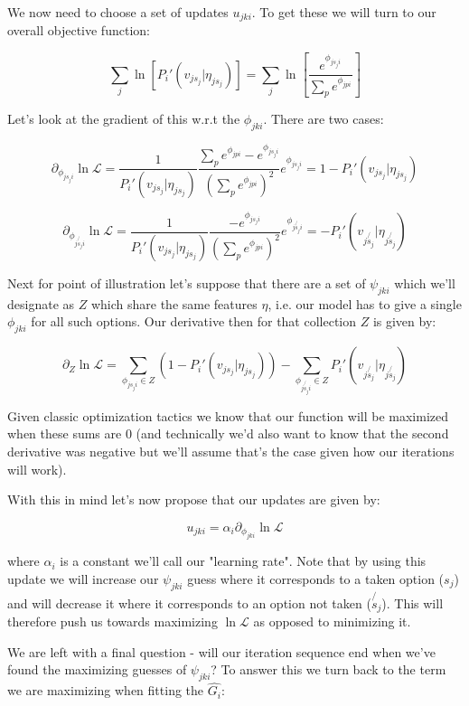 \documentclass[11pt]{article}
\begin{document}
We now need to choose a set of updates $u_{jki}$. To get these we will turn to our overall objective function:

$$\sum_j \ln{\left[ P_i'(v_{js_j} | \eta_{js_j}) \right]}= \sum_j \ln{\left[ \frac{e^{\phi_{js_ji}}}{\sum_p e^{\phi_{jpi}}} \right]}$$

Let's look at the gradient of this w.r.t the $\phi_{jki}$. There are two cases:

$$\partial_{\phi_{js_ji}}\ln{\mathcal{L}}
=
\frac{1}{P_i'(v_{js_j} | \eta_{js_j})}\frac{\sum_p e^{\phi_{jpi}}-e^{\phi_{js_ji}}}{\left( \sum_p e^{\phi_{jpi}} \right)^2} e^{\phi_{js_ji}}
=
1-P_i'(v_{js_j} | \eta_{js_j}) $$ 

$$\partial_{\phi_{j\not{s_j}i}}\ln{\mathcal{L}}
=
\frac{1}{P_i'(v_{js_j} | \eta_{js_j})}\frac{-e^{\phi_{js_ji}}}{\left( \sum_p e^{\phi_{jpi}} \right)^2} e^{\phi_{j\not{s_j}i}}
= 
-P_i'(v_{j\not{s_j}} | \eta_{j\not{s_j}})$$ 

Next for point of illustration let's suppose that there are a set of $\psi_{jki}$ which we'll designate as $Z$ which share the same features $\eta$, i.e. our model has to give a single $\phi_{jki}$ for all such options. Our derivative then for that collection $Z$ is given by:

$$\partial_Z \ln{\mathcal{L}}=\sum_{\phi_{js_ji} \in Z}\left(1-P_i'(v_{js_j} | \eta_{js_j}) \right)-\sum_{\phi_{j\not{s_j}i}\in Z}P_i'(v_{j\not{s_j}} | \eta_{j\not{s_j}})$$

Given classic optimization tactics we know that our function will be maximized when these sums are $0$ (and technically we'd also want to know that the second derivative was negative but we'll assume that's the case given how our iterations will work). \newline

With this in mind let's now propose that our updates are given by:

$$u_{jki} = \alpha_i \partial_{\phi_{jki}} \ln{\mathcal{L}} $$

where $\alpha_i$ is a constant we'll call our "learning rate". Note that by using this update we will increase our $\psi_{jki}$ guess where it corresponds to a taken option ($s_j$) and will decrease it where it corresponds to an option not taken ($\not{s_j}$). This will therefore push us towards maximizing $\ln{\mathcal{L}}$ as opposed to minimizing it. \newline

We are left with a final question - will our iteration sequence end when we've found the maximizing guesses of $\psi_{jki}$? To answer this we turn back to the term we are maximizing when fitting the $\hat{G_i}$: 
\end{document}
